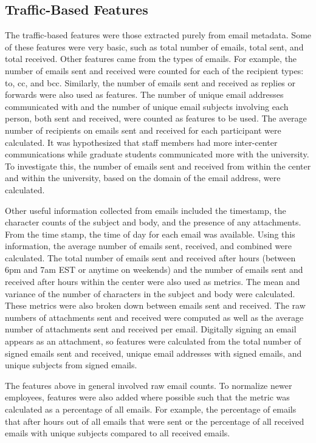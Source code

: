 \documentclass{article}
\begin{document}
\subsection{Traffic-Based Features}
The traffic-based features were those extracted purely from email metadata.  Some of these features were very basic, such as total number of emails, total sent, and total received.  Other features came from the types of emails.  For example, the number of emails sent and received were counted for each of the recipient types: to, cc, and bcc.  Similarly, the number of emails sent and received as replies or forwards were also used as features.  The number of unique email addresses communicated with and the number of unique email subjects involving each person, both sent and received, were counted as features to be used.  The average number of recipients on emails sent and received for each participant were calculated.  It was hypothesized that staff members had more inter-center communications while graduate students communicated more with the university.  To investigate this, the number of emails sent and received from within the center and within the university, based on the domain of the email address, were calculated.  
\par
Other useful information collected from emails included the timestamp, the character counts of the subject and body, and the presence of any attachments. From the time stamp, the time of day for each email was available.  Using this information, the average number of emails sent, received, and combined were calculated.  The total number of emails sent and received after hours (between 6pm and 7am EST or anytime on weekends) and the number of emails sent and received after hours within the center were also used as metrics.  The mean and variance of the number of characters in the subject and body were calculated.  These metrics were also broken down between emails sent and received.  The raw numbers of attachments sent and received were computed as well as the average number of attachments sent and received per email.  Digitally signing an email appears as an attachment, so features were calculated from the total number of signed emails sent and received, unique email addresses with signed emails, and unique subjects from signed emails.
\par
The features above in general involved raw email counts.  To normalize newer employees, features were also added where possible such that the metric was calculated as a percentage of all emails.  For example, the percentage of emails that after hours out of all emails that were sent or the percentage of all received emails with unique subjects compared to all received emails.
\end{document}
